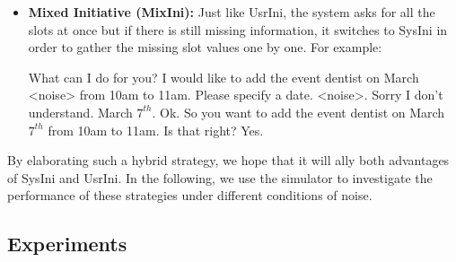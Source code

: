 \begin{itemize}
          \item \textbf{Mixed Initiative (MixIni):} Just like UsrIni, the system asks for all the slots at once but if there is still missing information, it switches to SysIni in order to gather the missing slot values one by one. For example:
              \begin{dialogue}
                   What can I do for you?
                   I would like to add the event dentist on March <noise> from 10am to 11am.
                   Please specify a date.
                   <noise>.
                   Sorry I don't understand.
                   March $7^{th}$.
                   Ok. So you want to add the event dentist on March $7^{th}$ from 10am to 11am. Is that right?
                   Yes.
              \end{dialogue}
     	\end{itemize}

              By elaborating such a hybrid strategy, we hope that it will ally both advantages of SysIni and UsrIni. In the following, we use the simulator to investigate the performance of these strategies under different conditions of noise.
              
    \subsection{Experiments}
    
